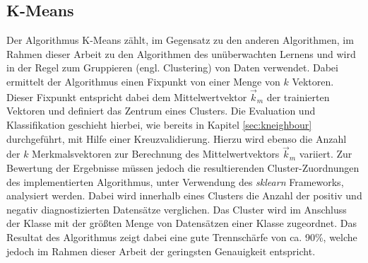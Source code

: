 \subsection{K-Means}
Der Algorithmus K-Means zählt, im Gegensatz zu den anderen Algorithmen, im Rahmen dieser Arbeit zu den Algorithmen des unüberwachten Lernens und wird in der Regel zum Gruppieren (engl. \glqq Clustering\grqq) von Daten verwendet. Dabei ermittelt der Algorithmus einen Fixpunkt von einer Menge von $k$ Vektoren. Dieser Fixpunkt entspricht dabei dem Mittelwertvektor $\vec{k}_m$ der trainierten Vektoren und definiert das Zentrum eines Clusters.
Die Evaluation und Klassifikation geschieht hierbei, wie bereits in Kapitel \ref{sec:kneighbour} durchgeführt, mit Hilfe einer Kreuzvalidierung. Hierzu wird ebenso die Anzahl der $k$ Merkmalsvektoren zur Berechnung des Mittelwertvektors $\vec{k}_m$ variiert. 
Zur Bewertung der Ergebnisse müssen jedoch die resultierenden Cluster-Zuordnungen des implementierten Algorithmus, unter Verwendung des \textit{sklearn} Frameworks, analysiert werden. Dabei wird innerhalb eines Clusters die Anzahl der positiv und negativ diagnostizierten Datensätze verglichen. Das Cluster wird im Anschluss der Klasse mit der größten Menge von Datensätzen einer Klasse zugeordnet.
Das Resultat des Algorithmus zeigt dabei eine gute Trennschärfe von ca. 90\%, welche jedoch im Rahmen dieser Arbeit der geringsten Genauigkeit entspricht.